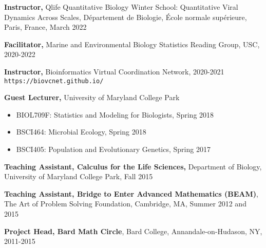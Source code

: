 \documentclass[]{res}
\begin{document}
\begin{resume}
{\bf Instructor,} Qlife Quantitative Biology Winter School: Quantitative Viral Dynamics Across Scales, D\'{e}partement de Biologie, \'{E}cole normale sup\'{e}rieure, Paris, France, March 2022

{\bf Facilitator,} {Marine and Environmental Biology Statistics Reading Group}, USC, 2020-2022

{\bf Instructor,} Bioinformatics Virtual Coordination Network, 2020-2021\\
\verb|https://biovcnet.github.io/|

{\bf Guest Lecturer,} University of Maryland College Park
\begin{itemize} \itemsep -2pt
\item BIOL709F: Statistics and Modeling for Biologists, Spring 2018
\item BSCI464: Microbial Ecology, Spring 2018 
\item BSCI405: Population and Evolutionary Genetics, Spring 2017
\end{itemize}

{\bf Teaching Assistant, Calculus for the Life Sciences,} Department of Biology, University of Maryland College Park, Fall 2015%

{\bf Teaching Assistant, Bridge to Enter Advanced Mathematics (BEAM)}, The Art of Problem Solving Foundation, Cambridge, MA, Summer 2012 and 2015 %

{\bf Project Head, Bard Math Circle}, Bard College, Annandale-on-Hudason, NY, 2011-2015

\clearpage


\end{resume}
\end{document}
